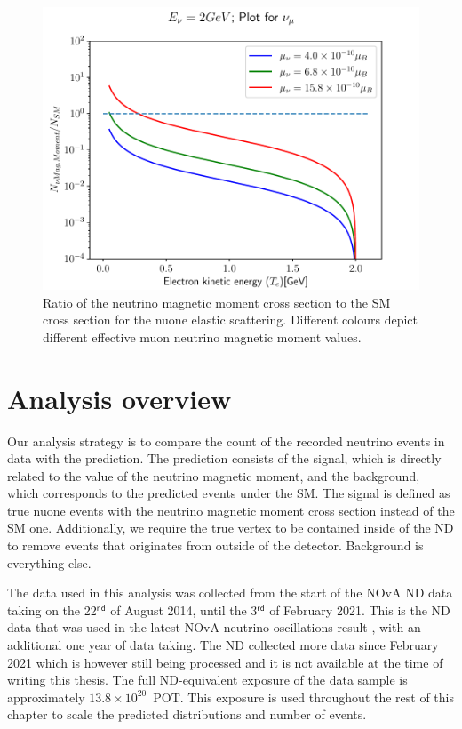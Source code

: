 \begin{figure}[hbtp]
\centering
\includegraphics[width=.9\textwidth]{Plots/NuMM/RatioNumuMMCompLinX.pdf}
\caption[Ratio of the neutrino magnetic moment and Standard Model cross sections]{Ratio of the neutrino magnetic moment cross section to the \acrshort{SM} cross section for the \acrshort{nuone} elastic scattering. Different colours depict different effective muon neutrino magnetic moment values.}
\label{fig:NuMMCrossSectionRatios}
\end{figure}

\section{Analysis overview}\label{sec:NuMMAnalysisOverview}

Our analysis strategy is to compare the count of the recorded neutrino events in data with the prediction. The prediction consists of the signal, which is directly related to the value of the neutrino magnetic moment, and the background, which corresponds to the predicted events under the \gls{SM}. The signal is defined as true \gls{nuone} events with the neutrino magnetic moment cross section instead of the \gls{SM} one. Additionally, we require the true vertex to be contained inside of the \gls{ND} to remove events that originates from outside of the detector. Background is everything else.

The data used in this analysis was collected from the start of the \gls{NOvA} \gls{ND} data taking on the 22$^{\textsf{nd}}$ of August 2014, until the 3$^{\textsf{rd}}$ of February 2021. This is the \gls{ND} data that was used in the latest \gls{NOvA} neutrino oscillations result \cite{NOvAResults2021.pdf}, with an additional one year of data taking. The \gls{ND} collected more data since February 2021 which is however still being processed and it is not available at the time of writing this thesis. The full \gls{ND}-equivalent exposure of the data sample is approximately $13.8\times10^{20}$~\gls{POT}. This exposure is used throughout the rest of this chapter to scale the predicted distributions and number of events. 

